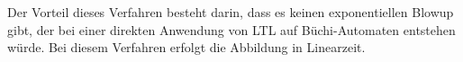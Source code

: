 Der Vorteil dieses Verfahren besteht darin, dass es keinen exponentiellen Blowup gibt, der bei einer direkten Anwendung von LTL auf Büchi-Automaten entstehen würde. Bei diesem Verfahren erfolgt die Abbildung in Linearzeit.



